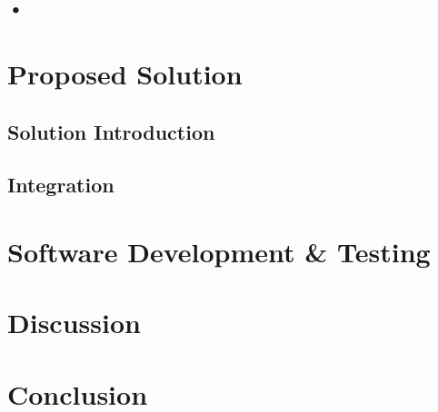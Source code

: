 \documentclass{cslthse-msc}
\begin{document}
\section{•}

\chapter{Proposed Solution}
\section{Solution Introduction}
\section{Integration}

\chapter{Software Development \& Testing}

\chapter{Discussion}

\chapter{Conclusion}
\end{document}
